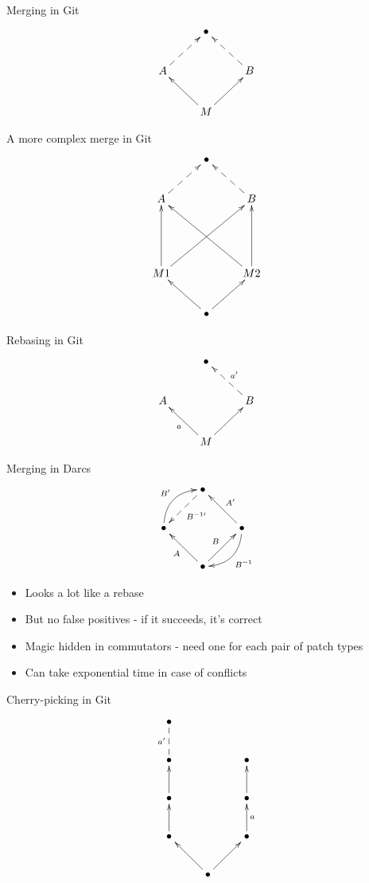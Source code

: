 \documentclass[pdf]{prosper}
\begin{document}

\begin{slide}{Merging in Git}
\[
\xymatrix{
& \bullet \\
A \ar@{-->}[ur] & & B \ar@{-->}[ul] \\
& M \ar[ul] \ar[ur]
}
\]
\end{slide}

\begin{slide}{A more complex merge in Git}
\[
\xymatrix{
& \bullet \\
A \ar@{-->}[ur] & & B \ar@{-->}[ul] \\
\\
M1 \ar[uu] \ar[uurr]
&& M2 \ar[uull] \ar[uu] \\
& \bullet \ar[ul] \ar[ur]
}
\]
\end{slide}

\begin{slide}{Rebasing in Git}
\[
\xymatrix{
& \bullet \\
A & & B \ar@{-->}_{a'}[ul] \\
& M \ar[ul]^a \ar[ur]
}
\]
\end{slide}

\begin{slide}{Merging in Darcs}
\[
\xymatrix{
& \bullet \ar@{-->}[dl]^*{\object{\scriptstyle{B^{-1\prime}}}} \\
\bullet \ar@/^1pc/[ur]^{B'}
& & \bullet \ar@/^1pc/[dl]^*{\object{\scriptstyle{B^{-1}}}} \ar[ul]_{A'} \\
& \bullet \ar[ul]^A \ar[ur]^B
}
\]
\begin{itemize}
\item Looks a lot like a rebase
\item But no false positives - if it succeeds, it's correct
\item Magic hidden in commutators - need one for each pair of patch types
\item Can take exponential time in case of conflicts
\end{itemize}
\end{slide}


\begin{slide}{Cherry-picking in Git}
\[
\xymatrix{
	\bullet \\
	\bullet \ar@{--}[u]^{a'} && \bullet \\
	\bullet \ar[u] && \bullet \ar[u] \\
	\bullet \ar[u] && \bullet \ar[u]_a \\
	& \bullet \ar[ul] \ar[ur]
}
\]
\end{slide}
\end{document}
